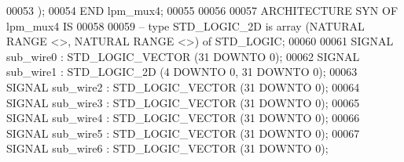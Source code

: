 \begin{DoxyCode}
{00053     \textcolor{vhdlchar}{)};
00054 \textcolor{keywordflow}{END} \textcolor{vhdlchar}{lpm\_mux4};
00055 
00056 
00057 \textcolor{keywordflow}{ARCHITECTURE} SYN \textcolor{keywordflow}{OF} lpm_mux4 IS
00058 
00059 \textcolor{keyword}{--  type STD\_LOGIC\_2D is array (NATURAL RANGE <>, NATURAL RANGE <>) of STD\_LOGIC;}
00060 
00061     \textcolor{keywordflow}{SIGNAL} \textcolor{vhdlchar}{sub_wire0}    \textcolor{vhdlchar}{:} \textcolor{comment}{STD\_LOGIC\_VECTOR} \textcolor{vhdlchar}{(}\textcolor{vhdllogic}{}\textcolor{vhdllogic}{31} \textcolor{keywordflow}{DOWNTO} \textcolor{vhdllogic}{}\textcolor{vhdllogic}{0}\textcolor{vhdlchar}{)};
00062     \textcolor{keywordflow}{SIGNAL} \textcolor{vhdlchar}{sub_wire1}    \textcolor{vhdlchar}{:} \textcolor{vhdlchar}{STD\_LOGIC\_2D} \textcolor{vhdlchar}{(}\textcolor{vhdllogic}{}\textcolor{vhdllogic}{4} \textcolor{keywordflow}{DOWNTO} \textcolor{vhdllogic}{}\textcolor{vhdllogic}{0}\textcolor{vhdlchar}{,} \textcolor{vhdllogic}{}\textcolor{vhdllogic}{31} \textcolor{keywordflow}{DOWNTO} \textcolor{vhdllogic}{}\textcolor{vhdllogic}{0}\textcolor{vhdlchar}{)};
00063     \textcolor{keywordflow}{SIGNAL} \textcolor{vhdlchar}{sub_wire2}    \textcolor{vhdlchar}{:} \textcolor{comment}{STD\_LOGIC\_VECTOR} \textcolor{vhdlchar}{(}\textcolor{vhdllogic}{}\textcolor{vhdllogic}{31} \textcolor{keywordflow}{DOWNTO} \textcolor{vhdllogic}{}\textcolor{vhdllogic}{0}\textcolor{vhdlchar}{)};
00064     \textcolor{keywordflow}{SIGNAL} \textcolor{vhdlchar}{sub_wire3}    \textcolor{vhdlchar}{:} \textcolor{comment}{STD\_LOGIC\_VECTOR} \textcolor{vhdlchar}{(}\textcolor{vhdllogic}{}\textcolor{vhdllogic}{31} \textcolor{keywordflow}{DOWNTO} \textcolor{vhdllogic}{}\textcolor{vhdllogic}{0}\textcolor{vhdlchar}{)};
00065     \textcolor{keywordflow}{SIGNAL} \textcolor{vhdlchar}{sub_wire4}    \textcolor{vhdlchar}{:} \textcolor{comment}{STD\_LOGIC\_VECTOR} \textcolor{vhdlchar}{(}\textcolor{vhdllogic}{}\textcolor{vhdllogic}{31} \textcolor{keywordflow}{DOWNTO} \textcolor{vhdllogic}{}\textcolor{vhdllogic}{0}\textcolor{vhdlchar}{)};
00066     \textcolor{keywordflow}{SIGNAL} \textcolor{vhdlchar}{sub_wire5}    \textcolor{vhdlchar}{:} \textcolor{comment}{STD\_LOGIC\_VECTOR} \textcolor{vhdlchar}{(}\textcolor{vhdllogic}{}\textcolor{vhdllogic}{31} \textcolor{keywordflow}{DOWNTO} \textcolor{vhdllogic}{}\textcolor{vhdllogic}{0}\textcolor{vhdlchar}{)};
00067     \textcolor{keywordflow}{SIGNAL} \textcolor{vhdlchar}{sub_wire6}    \textcolor{vhdlchar}{:} \textcolor{comment}{STD\_LOGIC\_VECTOR} \textcolor{vhdlchar}{(}\textcolor{vhdllogic}{}\textcolor{vhdllogic}{31} \textcolor{keywordflow}{DOWNTO} \textcolor{vhdllogic}{}\textcolor{vhdllogic}{0}\textcolor{vhdlchar}{)};
}
\end{DoxyCode}
